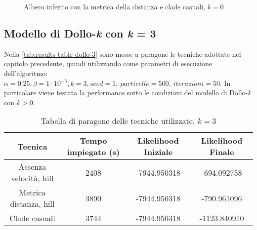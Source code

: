 \begin{figure}[!h]
    \centering
    \caption{Albero inferito con la metrica della distanza e clade casuali, $k = 0$}
    \label{fig:results-tree-dollo-0-3}
\end{figure}

\subsection{Modello di Dollo-\textit{k} con \textit{k} = 3}

Nella \autoref{tab:results-table-dollo-3} sono messe a paragone le tecniche adottate nel capitolo precedente, quindi utilizzando come parametri di esecuzione dell'algoritmo: $\alpha = 0.25, \beta = 1\cdot 10^{-5}, k = 3, seed = 1,\ particelle = 500,\ iterazioni = 50$. In particolare viene testata la performance sotto le condizioni del modello di Dollo-\textit{k} con $k > 0$.

\begin{table}[!h]
    \centering
    \begin{tabular}{c | c | c | c }
        Tecnica & Tempo impiegato (s) & Likelihood Iniziale & Likelihood Finale \\ \midrule \midrule 
        Assenza velocità, hill & 2408 & -7944.950318 & -694.092758 \\
        Metrica distanza, hill & 3890 & -7944.950318 & -790.961096 \\
        Clade casuali & 3744 & -7944.950318 & -1123.840910
    \end{tabular}
    \caption{Tabella di paragone delle tecniche utilizzate, $k = 3$}
    \label{tab:results-table-dollo-3}
\end{table}

